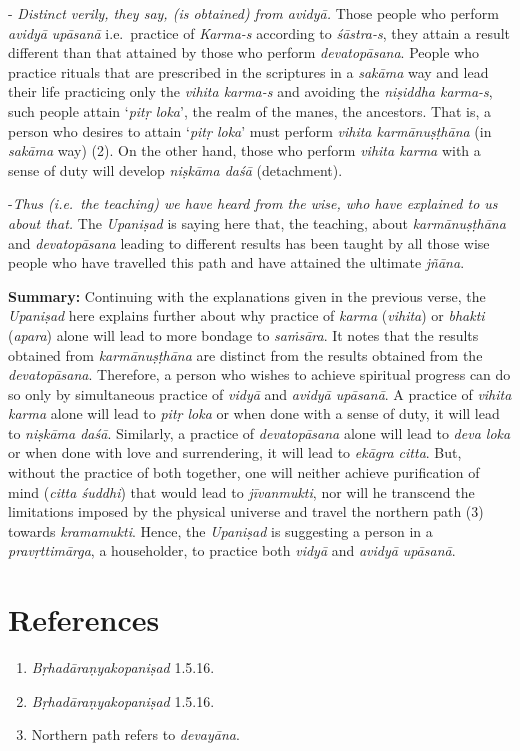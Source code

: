  - \emph{Distinct verily, they say, (is obtained) from avidyā.} Those people who perform \emph{avidyā} \emph{upāsanā} i.e.\ practice of \emph{Karma-s} according to \emph{śāstra-s}, they attain a result different than that attained by those who perform \emph{devatopāsana}. People who practice rituals that are prescribed in the scriptures in a \emph{sakāma} way and lead their life practicing only the \emph{vihita karma-s} and avoiding the \emph{niṣiddha karma-s}, such people attain `\emph{pitṛ loka}', the realm of the manes, the ancestors. That is, a person who desires to attain `\emph{pitṛ loka}' must perform \emph{vihita karmānuṣṭhāna} (in \emph{sakāma} way) (2). On the other hand, those who perform \emph{vihita karma} with a sense of duty will develop \emph{niṣkāma daśā} (detachment).

-\emph{Thus (i.e.\ the teaching) we have heard from the wise, who have explained to us about that.} The \emph{Upaniṣad} is saying here that, the teaching, about \emph{karmānuṣṭhāna} and \emph{devatopāsana} leading to different results has been taught by all those wise people who have travelled this path and have attained the ultimate \emph{jñāna}.

\textbf{Summary:} Continuing with the explanations given in the previous verse, the \emph{Upaniṣad} here explains further about why practice of \emph{karma} (\emph{vihita}) or \emph{bhakti} (\emph{apara}) alone will lead to more bondage to \emph{saṁsāra}. It notes that the results obtained from \emph{karmānuṣṭhāna} are distinct from the results obtained from the \emph{devatopāsana}. Therefore, a person who wishes to achieve spiritual progress can do so only by simultaneous practice of \emph{vidyā} and \emph{avidyā upāsanā}. A practice of \emph{vihita karma} alone will lead to \emph{pitṛ loka} or when done with a sense of duty, it will lead to \emph{niṣkāma daśā}. Similarly, a practice of \emph{devatopāsana} alone will lead to \emph{deva loka} or when done with love and surrendering, it will lead to \emph{ekāgra citta}. But, without the practice of both together, one will neither achieve purification of mind (\emph{citta śuddhi}) that would lead to \emph{jīvanmukti}, nor will he transcend the limitations imposed by the physical universe and travel the northern path (3) towards \emph{kramamukti}. Hence, the \emph{Upaniṣad} is suggesting a person in a \emph{pravṛttimārga}, a householder, to practice both \emph{vidyā} and \emph{avidyā} \emph{upāsanā}.

\section*{References}

\begin{enumerate}
\itemsep=0pt
\item
  \emph{Bṛhadāraṇyakopaniṣad} 1.5.16.
\item
  \emph{Bṛhadāraṇyakopaniṣad} 1.5.16.
\item
  Northern path refers to \emph{devayāna}.
\end{enumerate}


